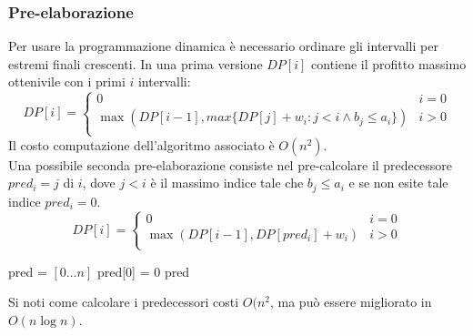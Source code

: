 \subsubsection{Pre-elaborazione}
Per usare la programmazione dinamica \`e necessario ordinare gli intervalli per estremi finali crescenti. In una prima versione $DP[i]$ contiene il profitto massimo ottenivile con i
primi $i$ intervalli:
$$DP[i] =\begin{cases}
	0 & i = 0\\
	\max(DP[i-1], max\{DP[j]+w_i: j < i \land b_j\le a_i\}) & i >0\\
\end{cases}$$
Il costo computazione dell'algoritmo associato \`e $O(n^2)$.\\
Una possibile seconda pre-elaborazione consiste nel pre-calcolare il predecessore $pred_i = j$ di $i$, dove $j < i$ \`e il massimo indice tale che $b_j\le a_i$ e se non esite tale 
indice $pred_i = 0$. 
$$DP[i] = \begin{cases}
	0 & i = 0\\
	\max(DP[i-1], DP[pred_i]+w_i) & i > 0\\
\end{cases}$$
\begin{algorithm}[H]
\DontPrintSemicolon
{}





\SetKwFunction{}{}
\SetKwFunction{}{}
\SetKwFunction{}{}
\SetKwFunction{}{}
\SetKwFunction{}{}


\caption{\protect\Int[] \protect{}}
\Int[] pred = \New \Int$[0\dots n]$\;
pred[0] = 0\;
\Return pred\;
\end{algorithm}
Si noti come calcolare i predecessori costi $O(n^2$, ma pu\`o essere migliorato in $O(n\log n)$. 
